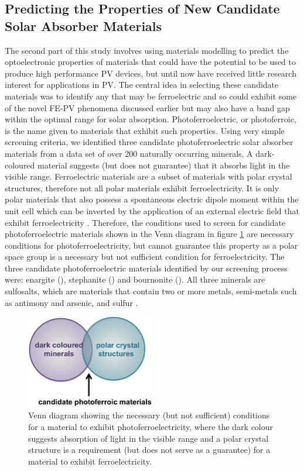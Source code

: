 \subsection{Predicting the Properties of New Candidate Solar Absorber Materials}
The second part of this study involves using materials modelling to predict the optoelectronic properties of materials that could have the potential to be used to produce high performance PV devices, but until now have received little research interest for applications in PV.  The central idea in selecting these candidate materials was to identify any that may be ferroelectric and so could exhibit some of the novel FE-PV phenomena discussed earlier but may also have a band gap within the optimal range for solar absorption. Photoferroelectric, or photoferroic, is the name given to materials that exhibit such properties. 
Using very simple screening criteria, we identified three candidate photoferroelectric solar absorber materials from a data set of over 200 naturally occurring minerals. 
A dark-coloured material suggests (but does not guarantee) that it absorbs light in the visible range. Ferroelectric materials are a subset of materials with polar crystal structures, therefore not all polar materials exhibit ferroelectricity. It is only polar materials that also possess a spontaneous electric dipole moment within the unit cell which can be inverted by the application of an external electric field that exhibit ferroelectricity \cite{FE_subset}. 
Therefore, the conditions used to screen for candidate photoferroelectric materials shown in the Venn diagram in figure \ref{vd} are necessary conditions for photoferroelectricity, but cannot guarantee this property as a polar space group is a necessary but not sufficient condition for ferroelectricity.
The three candidate photoferroelectric materials identified by our screening process were: enargite (\enargite), stephanite (\stephanite) and bournonite (\bournonite). All three minerals are sulfosalts, which are materials that contain two or more metals, semi-metals such as antimony and arsenic, and sulfur \cite{DK}. \\

\begin{figure}[h!]
  \centering
    \includegraphics[width=0.5\textwidth]{figures/venn_diagram.png}
    \caption{Venn diagram showing the necessary (but not sufficient) conditions for a material to exhibit photoferroelectricity, where the dark colour suggests absorption of light in the visible range and a polar crystal structure is a requirement (but does not serve as a guarantee) for a material to exhibit ferroelectricity.}
  \label{vd}
\end{figure}

